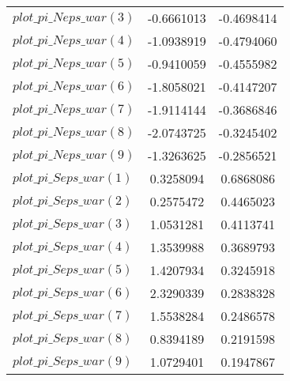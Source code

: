 \begin{center}
\begin{longtable}{lcc}
$plot\_pi\_N eps\_war (3)   $	 & 	     -0.6661013	 & 	     -0.4698414 \\ 
$plot\_pi\_N eps\_war (4)   $	 & 	     -1.0938919	 & 	     -0.4794060 \\ 
$plot\_pi\_N eps\_war (5)   $	 & 	     -0.9410059	 & 	     -0.4555982 \\ 
$plot\_pi\_N eps\_war (6)   $	 & 	     -1.8058021	 & 	     -0.4147207 \\ 
$plot\_pi\_N eps\_war (7)   $	 & 	     -1.9114144	 & 	     -0.3686846 \\ 
$plot\_pi\_N eps\_war (8)   $	 & 	     -2.0743725	 & 	     -0.3245402 \\ 
$plot\_pi\_N eps\_war (9)   $	 & 	     -1.3263625	 & 	     -0.2856521 \\ 
$plot\_pi\_S eps\_war (1)   $	 & 	      0.3258094	 & 	      0.6868086 \\ 
$plot\_pi\_S eps\_war (2)   $	 & 	      0.2575472	 & 	      0.4465023 \\ 
$plot\_pi\_S eps\_war (3)   $	 & 	      1.0531281	 & 	      0.4113741 \\ 
$plot\_pi\_S eps\_war (4)   $	 & 	      1.3539988	 & 	      0.3689793 \\ 
$plot\_pi\_S eps\_war (5)   $	 & 	      1.4207934	 & 	      0.3245918 \\ 
$plot\_pi\_S eps\_war (6)   $	 & 	      2.3290339	 & 	      0.2838328 \\ 
$plot\_pi\_S eps\_war (7)   $	 & 	      1.5538284	 & 	      0.2486578 \\ 
$plot\_pi\_S eps\_war (8)   $	 & 	      0.8394189	 & 	      0.2191598 \\ 
$plot\_pi\_S eps\_war (9)   $	 & 	      1.0729401	 & 	      0.1947867 \\ 
\end{longtable}
 \end{center}
